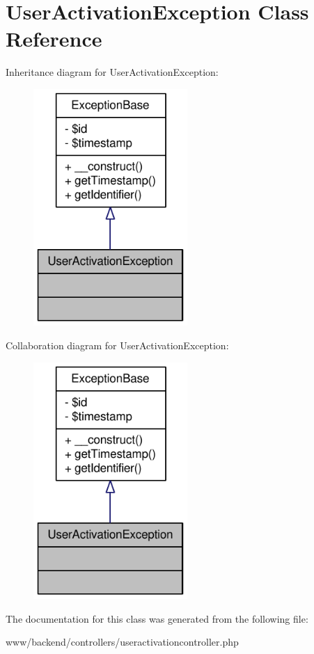 \hypertarget{classUserActivationException}{
\section{UserActivationException Class Reference}
\label{classUserActivationException}
}


Inheritance diagram for UserActivationException:\nopagebreak
\begin{figure}[H]
\begin{center}
\leavevmode
\includegraphics[width=166pt]{classUserActivationException__inherit__graph}
\end{center}
\end{figure}


Collaboration diagram for UserActivationException:\nopagebreak
\begin{figure}[H]
\begin{center}
\leavevmode
\includegraphics[width=166pt]{classUserActivationException__coll__graph}
\end{center}
\end{figure}


The documentation for this class was generated from the following file:\begin{DoxyCompactItemize}
\item 
www/backend/controllers/useractivationcontroller.php\end{DoxyCompactItemize}
